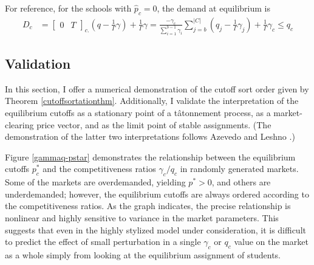 \documentclass[12pt]{article}
\theoremstyle{definition}
\begin{document}
For reference, for the schools with $\hat p_c = 0$, the demand at equilibrium is 
\begin{align*} \label{demand-pc-eq-zero}
D_c &=
\begin{bmatrix}
0& T
\end{bmatrix}_{c.} \left(q - \frac{1}{\Gamma}\gamma\right) + \frac{1}{\Gamma}\gamma  
= \frac{-\gamma_c}{\sum_{i=1}^{b-1} \gamma_i} \sum_{j=b}^{|C|} \left(q_j - \frac{1}{\Gamma}\gamma_j\right)  + \frac{1}{\Gamma}\gamma_c \leq q_c
\end{align*}


\subsection{Validation}
In this section, I offer a numerical demonstration of the cutoff sort order given by Theorem \ref{cutoffsortationthm}. Additionally, I validate the interpretation of the equilibrium cutoffs as a stationary point of a t\^{a}tonnement process, as a market-clearing price vector, and as the limit point of stable assignments. (The demonstration of the latter two interpretations follows Azevedo and Leshno \parencite*{supplydemandfw}.)

Figure \ref{gammaq-pstar} demonstrates the relationship between the equilibrium cutoffs $p_c^*$ and the competitiveness ratios $\gamma_c / q_c$ in randomly generated markets. Some of the markets are overdemanded, yielding $p^* > 0$, and others are underdemanded; however, the equilibrium cutoffs are always ordered according to the competitiveness ratios. As the graph indicates, the precise relationship is nonlinear and highly sensitive to variance in the market parameters. This suggests that even in the highly stylized model under consideration, it is difficult to predict the effect of small perturbation in a single $\gamma_c$ or $q_c$ value on the market as a whole simply from looking at the equilibrium assignment of students. 
\end{document}
